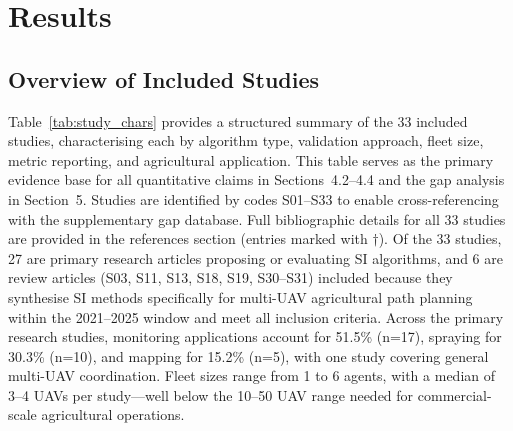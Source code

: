\documentclass[review,3p,times]{elsarticle}
\begin{document}
\section{Results}

\subsection{Overview of Included Studies}
Table~\ref{tab:study_chars} provides a structured summary of the 33 included studies, characterising each by algorithm type, validation approach, fleet size, metric reporting, and agricultural application. This table serves as the primary evidence base for all quantitative claims in Sections~4.2--4.4 and the gap analysis in Section~5. Studies are identified by codes S01--S33 to enable cross-referencing with the supplementary gap database. Full bibliographic details for all 33 studies are provided in the references section (entries marked with $\dagger$). Of the 33 studies, 27 are primary research articles proposing or evaluating SI algorithms, and 6 are review articles (S03, S11, S13, S18, S19, S30--S31) included because they synthesise SI methods specifically for multi-UAV agricultural path planning within the 2021--2025 window and meet all inclusion criteria. Across the primary research studies, monitoring applications account for 51.5\% (n=17), spraying for 30.3\% (n=10), and mapping for 15.2\% (n=5), with one study covering general multi-UAV coordination. Fleet sizes range from 1 to 6 agents, with a median of 3--4 UAVs per study---well below the 10--50 UAV range needed for commercial-scale agricultural operations.
\end{document}
